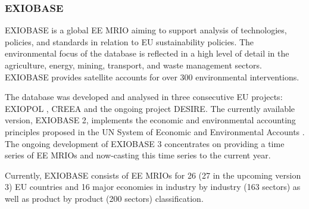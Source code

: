 \subsubsection{EXIOBASE}


EXIOBASE is a global EE MRIO aiming to support analysis of technologies,
policies, and standards in relation to EU sustainability policies. The
environmental focus of the database is reflected in a high level of detail in the
agriculture, energy, mining, transport, and waste management sectors. EXIOBASE provides satellite accounts for over 300 environmental
interventions.  

The database was developed and analysed in three consecutive EU projects: EXIOPOL \cite{Tukker_2013}, CREEA \cite{Wood_2014} and the ongoing project DESIRE. The currently available version, EXIOBASE 2, implements the
economic and environmental accounting principles proposed in the UN System of
Economic and Environmental Accounts \cite{european_commission_system_2014}.
The ongoing development of EXIOBASE 3 concentrates on providing a time series
of EE MRIOs and now-casting this time series to the current year. 

Currently, EXIOBASE consists of EE MRIOs for 26 (27 in the upcoming version 3) EU countries
and 16 major economies in industry by industry (163 sectors) as well as
product by product (200 sectors) classification.